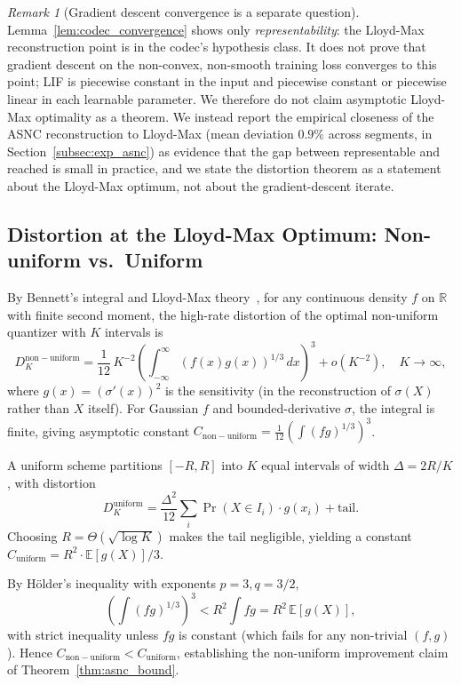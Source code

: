 \documentclass{article}
\theoremstyle{plain}
\theoremstyle{definition}
\theoremstyle{remark}
\newtheorem{remark}[theorem]{Remark}
\begin{document}
\begin{remark}[Gradient descent convergence is a separate question]
Lemma~\ref{lem:codec_convergence} shows only \emph{representability}: the
Lloyd-Max reconstruction point is in the codec's hypothesis class. It does
not prove that gradient descent on the non-convex, non-smooth training loss
converges to this point; LIF is piecewise constant in the input and
piecewise constant or piecewise linear in each learnable parameter. We
therefore do not claim asymptotic Lloyd-Max optimality as a theorem. We
instead report the empirical closeness of the ASNC reconstruction to
Lloyd-Max (mean deviation $0.9\%$ across segments, in
Section~\ref{subsec:exp_asnc}) as evidence that the gap between
representable and reached is small in practice, and we state the distortion
theorem as a statement about the Lloyd-Max optimum, not about the
gradient-descent iterate.
\end{remark}

\subsection{Distortion at the Lloyd-Max Optimum: Non-uniform vs.\ Uniform}

By Bennett's integral and Lloyd-Max theory~\citep{gersho1992vector}, for any
continuous density $f$ on $\mathbb{R}$ with finite second moment, the
high-rate distortion of the optimal non-uniform quantizer with $K$ intervals
is
\[
D_K^{\mathrm{non-uniform}}
= \frac{1}{12}\,K^{-2}
  \left(\int_{-\infty}^{\infty} (f(x)g(x))^{1/3}\,dx\right)^3
  + o(K^{-2}), \quad K\to\infty,
\]
where $g(x) = (\sigma'(x))^2$ is the sensitivity (in the reconstruction of
$\sigma(X)$ rather than $X$ itself). For Gaussian $f$ and bounded-derivative
$\sigma$, the integral is finite, giving asymptotic constant
$C_{\mathrm{non-uniform}} =
\tfrac{1}{12}(\int (fg)^{1/3})^3$.

A uniform scheme partitions $[-R,R]$ into $K$ equal intervals of width
$\Delta = 2R/K$, with distortion
\[
D_K^{\mathrm{uniform}}
= \frac{\Delta^2}{12}\sum_i\Pr(X\in I_i) \cdot g(x_i) + \text{tail}.
\]
Choosing $R = \Theta(\sqrt{\log K})$ makes the tail negligible, yielding a
constant $C_{\mathrm{uniform}} = R^2 \cdot \mathbb{E}[g(X)]/3$.

By Hölder's inequality with exponents $p=3,q=3/2$,
\[
\left(\int(fg)^{1/3}\right)^3 < R^2 \int fg = R^2\,\mathbb{E}[g(X)],
\]
with strict inequality unless $fg$ is constant (which fails for any
non-trivial $(f,g)$). Hence
$C_{\mathrm{non-uniform}} < C_{\mathrm{uniform}}$, establishing the
non-uniform improvement claim of Theorem~\ref{thm:asnc_bound}.
\end{document}
